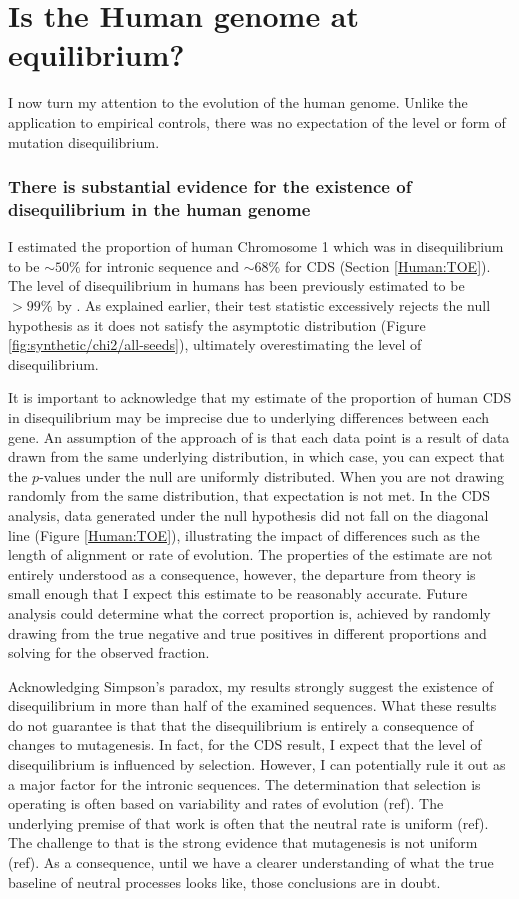 \section{Is the Human genome at equilibrium?}

I now turn my attention to the evolution of the human genome. Unlike the application to empirical controls, there was no expectation of the level or form of mutation disequilibrium. 

\subsubsection{There is substantial evidence for the existence of disequilibrium in the human genome}

I estimated the proportion of human Chromosome 1 which was in disequilibrium to be $\sim50\%$ for intronic sequence and $\sim68\%$ for CDS (Section \ref{Human:TOE}). The level of disequilibrium in humans has been previously estimated to be $>99\%$ by \cite{Squartini2008QuantifyingProcess}. As explained earlier, their test statistic excessively rejects the null hypothesis as it does not satisfy the asymptotic distribution (Figure \ref{fig:synthetic/chi2/all-seeds}), ultimately overestimating the level of disequilibrium. 

It is important to acknowledge that my estimate of the proportion of human CDS in disequilibrium may be imprecise due to underlying differences between each gene. An assumption of the approach of \cite{Storey2003StatisticalStudies} is that each data point is a result of data drawn from the same underlying distribution, in which case, you can expect that the $p$-values under the null are uniformly distributed. When you are not drawing randomly from the same distribution, that expectation is not met. In the CDS analysis, data generated under the null hypothesis did not fall on the diagonal line (Figure \ref{Human:TOE}), illustrating the impact of differences such as the length of alignment or rate of evolution. The properties of the estimate are not entirely understood as a consequence, however, the departure from theory is small enough that I expect this estimate to be reasonably accurate. Future analysis could determine what the correct proportion is, achieved by randomly drawing from the true negative and true positives in different proportions and solving for the observed fraction. 

Acknowledging Simpson's paradox, my results strongly suggest the existence of disequilibrium in more than half of the examined sequences. What these results do not guarantee is that that the disequilibrium is entirely a consequence of changes to mutagenesis. In fact, for the CDS result, I expect that the level of disequilibrium is influenced by selection. However, I can potentially rule it out as a major factor for the intronic sequences. The determination that selection is operating is often based on variability and rates of evolution (ref). The underlying premise of that work is often that the neutral rate is uniform (ref). The challenge to that is the strong evidence that mutagenesis is not uniform (ref). As a consequence, until we have a clearer understanding of what the true baseline of neutral processes looks like, those conclusions are in doubt. 

